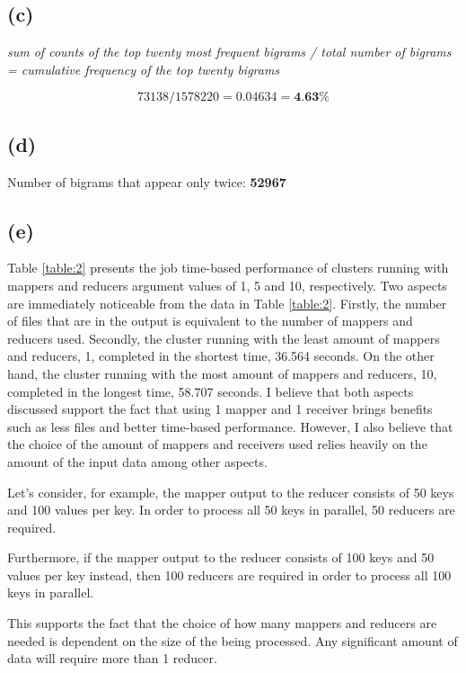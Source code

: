 \documentclass{article} %
\begin{document}
\subsection*{(c)}

\begin{center}
\textit{sum of counts of the top twenty most frequent bigrams / total number of bigrams\\ = cumulative frequency of the top twenty bigrams}
\end{center}
    
\[  73138 / 1578220 = 0.04634 = \textbf{4.63\%} \]

\subsection*{(d)}

Number of bigrams that appear only twice: \textbf{52967}

\subsection*{(e)}

Table \ref{table:2} presents the job time-based performance of clusters running with mappers and reducers argument values of 1, 5 and 10, respectively. Two aspects are immediately noticeable from the data in Table \ref{table:2}. Firstly, the number of files that are in the output is equivalent to the number of mappers and reducers used. Secondly, the cluster running with the least amount of mappers and reducers, 1, completed in the shortest time, 36.564 seconds. On the other hand, the cluster running with the most amount of mappers and reducers, 10, completed in the longest time, 58.707 seconds. I believe that both aspects discussed support the fact that using 1 mapper and 1 receiver brings benefits such as less files and better time-based performance. However, I also believe that the choice of the amount of mappers and receivers used relies heavily on the amount of the input data among other aspects.

Let's consider, for example, the mapper output to the reducer consists of 50 keys and 100 values per key. In order to process all 50 keys in parallel, 50 reducers are required.

Furthermore, if the mapper output to the reducer consists of 100 keys and 50 values per key instead, then 100 reducers are required in order to process all 100 keys in parallel.

This supports the fact that the choice of how many mappers and reducers are needed is dependent on the size of the being processed. Any significant amount of data will require more than 1 reducer.
\end{document}

